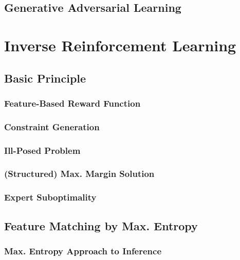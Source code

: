 		\subsection{Generative Adversarial Learning} %

	\section{Inverse Reinforcement Learning} %

		\subsection{Basic Principle} %

			\subsubsection{Feature-Based Reward Function} %

			\subsubsection{Constraint Generation} %

			\subsubsection{Ill-Posed Problem} %

			\subsubsection{(Structured) Max. Margin Solution} %

			\subsubsection{Expert Suboptimality} %

		\subsection{Feature Matching by Max. Entropy} %

			\subsubsection{Max. Entropy Approach to Inference} %

